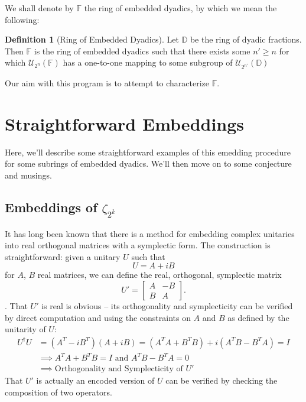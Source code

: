 \documentclass{article}
\theoremstyle{definition}
\newtheorem{definition}{Definition}
\theoremstyle{theorem}
\theoremstyle{remark}
\begin{document}
	  We shall denote by $\mathbb{F}$ the ring of embedded dyadics, by which we mean the following:
	  \begin{definition}[Ring of Embedded Dyadics]
	  	Let $\mathbb{D}$ be the ring of dyadic fractions. Then $\mathbb{F}$ is the ring of embedded dyadics such that there exists some $n'\geq n$ for which $\mathcal{U}_{2^n}(\mathbb{F})$ has a one-to-one mapping to some subgroup of $\mathcal{U}_{2^{n'}}(\mathbb{D})$	\end{definition}
  Our aim with this program is to attempt to characterize $\mathbb{F}$.
	  \section{Straightforward Embeddings}
	  Here, we'll describe some straightforward examples of this emedding procedure for some subrings of embedded dyadics. We'll then move on to some conjecture and musings.
	  
	  \subsection{Embeddings of $\zeta_{2^k}$}
	  It has long been known that there is a method for embedding complex unitaries into real orthogonal matrices with a symplectic form. The construction is straightforward: given a unitary $U$ such that
	  \[
	  	U = A + iB
	  \]
	  for $A$, $B$ real matrices, we can define the real, orthogonal, symplectic matrix
	  \[
	  	U' = \begin{bmatrix}
	  	A & -B \\
	  	B & A
	  	\end{bmatrix}.
	  \].
	  That $U'$ is real is obvious -- its orthogonality and symplecticity can be verified by direct computation and using the constraints on $A$ and $B$ as defined by the unitarity of $U$:
  		\begin{align*}
  		U^\dagger U &= (A^T-iB^T)(A+iB) = (A^T A + B^T B) + i(A^T B - B^T A) = I\\
  		&\implies A^T A + B^T B = I \mbox{ and } A^T B - B^T A = 0\\
  		&\implies \mbox{Orthogonality and Symplecticity of } U'
    	\end{align*}
    	That $U'$ is actually an encoded version of $U$ can be verified by checking the composition of two operators.
    	    	
\end{document}
